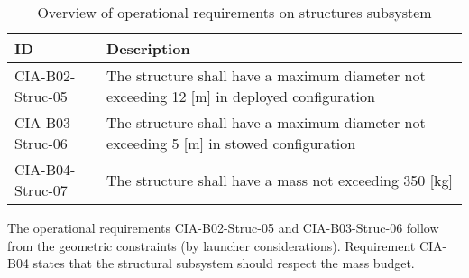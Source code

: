 \begin{table}[H]
	\caption{Overview of operational requirements on structures subsystem}
	\begin{tabular}{|p{}|p{}|}
    \hline
    ID          & Description                                                                                                      \\ \hline \hline
    CIA-B02-Struc-05 & The structure shall have a maximum diameter not exceeding 12 [m] in deployed configuration     \\ \hline
    CIA-B03-Struc-06 &  The structure shall have a maximum diameter not exceeding 5 [m] in stowed configuration                              \\ \hline
    CIA-B04-Struc-07 & The structure shall have a mass not exceeding 350 [kg]\\ \hline
    \end{tabular}
    \label{tab:strucoprequirements}
\end{table}
The operational requirements CIA-B02-Struc-05 and CIA-B03-Struc-06 follow from the geometric constraints (by launcher considerations). Requirement CIA-B04 states that the structural subsystem should respect the mass budget.